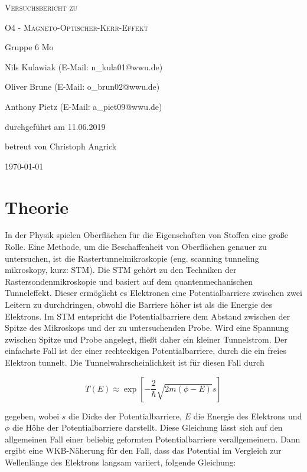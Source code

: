 \documentclass[
	a4paper,
	12pt,
	pagesize,
	ngerman
]{scrartcl}
\begin{document}
\begin{titlepage}
	\centering
	{\scshape\LARGE Versuchsbericht zu \par}
	\vspace{1cm}
	{\scshape\huge O4 - Magneto-Optischer-Kerr-Effekt \par}
	\vspace{2.5cm}
	{\LARGE Gruppe 6 Mo\par}
	\vspace{0.5cm}
	{\large Nils Kulawiak (E-Mail: n\_kula01@wwu.de) \par}
	{\large Oliver Brune (E-Mail: o\_brun02@wwu.de) \par}
	{\large Anthony Pietz (E-Mail: a\_piet09@wwu.de) \par}
	\vfill
	durchgeführt am 11.06.2019\par
	
	\vfill
	betreut von Christoph Angrick
	{\large \today\par}
\end{titlepage}

\tableofcontents
		
\newpage

\section{Theorie}
In der Physik spielen Oberflächen für die Eigenschaften von Stoffen eine große Rolle. Eine Methode, um die Beschaffenheit von Oberflächen genauer zu untersuchen, ist die Rastertunnelmikroskopie (eng. scanning tunneling mikroskopy, kurz: STM). Die STM gehört zu den Techniken der Rastersondenmikroskopie und basiert auf dem  quantenmechanischen Tunneleffekt. Dieser ermöglicht es Elektronen eine Potentialbarriere zwischen zwei Leitern zu durchdringen, obwohl die Barriere höher ist als die Energie des Elektrons. Im STM entspricht die Potentialbarriere dem Abstand zwischen der Spitze des Mikroskops und der zu untersuchenden Probe. Wird eine Spannung zwischen Spitze und Probe angelegt, fließt daher ein kleiner Tunnelstrom. Der einfachste Fall ist der einer rechteckigen Potentialbarriere, durch die ein freies Elektron tunnelt. Die Tunnelwahrscheinlichkeit ist für diesen Fall durch

\begin{equation}
	T(E) \approx \exp [-\frac{2}{\hbar}\sqrt{2m(\phi - E)}s]
\end{equation}

gegeben, wobei $s$ die Dicke der Potentialbarriere, $E$ die Energie des Elektrons und $\phi$ die Höhe der Potentialbarriere darstellt. Diese Gleichung lässt sich auf den allgemeinen Fall einer beliebig geformten Potentialbarriere verallgemeinern. Dann ergibt eine WKB-Näherung für den Fall, dass das Potential im Vergleich zur Wellenlänge des Elektrons langsam variiert, folgende Gleichung:
\end{document}
